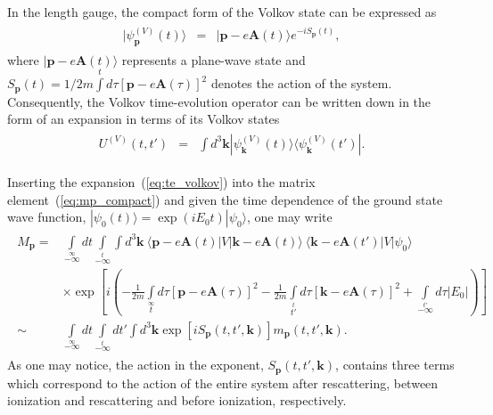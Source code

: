 In the length gauge, the compact form of the Volkov state can be
expressed as
\begin{eqnarray}
\label{eq:volkov_Lgauge}
\begin{split}
|\psi_{\mathbf{p}}^{(V)}(t)\rangle & = &
|\mathbf{p} - e\mathbf{A}(t)\rangle e^{-i S_{\mathbf{p}}(t)},
\end{split}
\end{eqnarray}
where $|\mathbf{p} - e\mathbf{A}(t)\rangle$ represents a plane-wave
state and
$S_{\mathbf{p}}(t) = 1/2m \int\limits^{t} d\tau [\mathbf{p} -
e\mathbf{A}(\tau)]^{2}$
denotes the action of the system. Consequently, the Volkov
time-evolution operator can be written down in the form of an
expansion in terms of its Volkov states
\begin{eqnarray}
\label{eq:te_volkov}
\begin{split}
U^{(V)}(t,t') & = & \int d^{3}\mathbf{k}
|\psi_{\mathbf{k}}^{(V)}(t) \rangle
\langle \psi_{\mathbf{k}}^{(V)}(t')|.
\end{split}
\end{eqnarray}

Inserting the expansion~(\ref{eq:te_volkov}) into the matrix
element~(\ref{eq:mp_compact}) and given the time dependence of the
ground state wave function,
$|\psi_{0}(t) \rangle = \exp{(iE_{0}t)} | \psi_{0} \rangle$,
one may write~\cite{KopoldOptComm2000}
\begin{eqnarray}
\label{eq:me_action}
\begin{split}
M_{\mathbf{p}} = & \int\limits_{-\infty}\limits^{\infty} dt
\int\limits_{-\infty}\limits^{t} \int d^{3}\mathbf{k}
\ \langle \mathbf{p} - e\mathbf{A}(t) | V | \mathbf{k} - e\mathbf{A}(t) \rangle
\ \langle \mathbf{k} - e\mathbf{A}(t') | V | \psi_{0} \rangle \\
&
\times
\exp \left[i\left(-\frac{1}{2m} \int\limits_{t}\limits^{\infty}
d\tau [\mathbf{p} -e\mathbf{A}(\tau)]^{2} -
\frac{1}{2m} \int\limits_{t'}\limits^{t} d\tau [\mathbf{k} -e\mathbf{A}(\tau)]^{2} +
\int\limits_{-\infty}\limits^{t'} d\tau |E_{0}|
\right)
\right] \\
\sim &
\int\limits_{-\infty}\limits^{\infty} dt
\int\limits_{-\infty}\limits^{t} dt'
\int d^{3}\mathbf{k} \exp \left[ iS_{\mathbf{p}}(t, t', \mathbf{k}) \right]
m_{\mathbf{p}}(t, t', \mathbf{k}).
\end{split}
\end{eqnarray}
As one may notice, the action in the exponent, $S_{\mathbf{p}}(t, t',
\mathbf{k})$, contains three terms which correspond to the action of
the entire system after rescattering, between ionization and
rescattering and before ionization, respectively.

